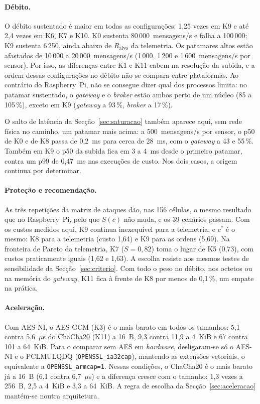 \paragraph{Débito.} O débito sustentado é maior em todas as configurações:
1,25 vezes em K9 e até 2,4 vezes em K6, K7 e K10. K0 sustenta
80\,000~mensagens/s e falha a 100\,000; K9 sustenta 6\,250, ainda abaixo de
$R_{\text{alvo}}$ da telemetria. Os patamares altos estão afastados de 10\,000 a
20\,000~mensagens/s (1\,000, 1\,200 e 1\,600~mensagens/s por sensor). Por isso, as
diferenças entre K1 e K11 cabem na resolução da subida, e a ordem dessas
configurações no débito não se compara entre plataformas. Ao contrário do
Raspberry~Pi, não se consegue dizer qual dos processos limita: no patamar
sustentado, o \emph{gateway} e o \emph{broker} estão ambos perto de um núcleo
(85 a 105\,\%), exceto em K9 (\emph{gateway} a 93\,\%, \emph{broker} a 17\,\%).

O salto de latência da Secção~\ref{sec:saturacao} também aparece aqui, sem rede
física no caminho, um patamar mais acima: a 500~mensagens/s por sensor, o p50 de
K0 e de K8 passa de 0,2~ms para cerca de 28~ms, com o \emph{gateway} a 43 e
55\,\%. Também em K9 o p50 da subida fica em 3 a 4~ms desde o primeiro patamar,
contra um p99 de 0,47~ms nas execuções de custo. Nos dois casos, a origem
continua por determinar.

\paragraph{Proteção e recomendação.} As três repetições da matriz de ataques dão,
nas 156 células, o mesmo resultado que no Raspberry~Pi, pelo que $S(c)$ não muda,
e os 39 cenários passam. Com os custos medidos aqui, K9 continua inexequível para
a telemetria, e $c^*$ é o mesmo: K8 para a telemetria (custo 1,64) e K9 para as
ordens (5,69). Na fronteira de Pareto da telemetria, K7 ($S = 0{,}82$) toma o
lugar de K5 (0,73), com custos praticamente iguais (1,62 e 1,63). A escolha
resiste aos mesmos testes de sensibilidade da Secção~\ref{sec:criterio}. Com todo
o peso no débito, nos octetos ou na memória do \emph{gateway}, K11 fica à frente
de K8 por menos de 0,1\,\%, um empate na prática.

\paragraph{Aceleração.} Com AES-NI, o AES-GCM (K3) é o mais barato em todos os
tamanhos: 5,1 contra 5,6~$\mu$s do ChaCha20 (K11) a 16~B, 9,3 contra 11,9 a
4~KiB e 67 contra 101 a 64~KiB. Para o comparar sem AES em \emph{hardware},
desligaram-se só o AES-NI e o PCLMULQDQ (\texttt{OPENSSL\_ia32cap}), mantendo as
extensões vetoriais, o equivalente a \texttt{OPENSSL\_armcap=1}. Nessas condições,
o ChaCha20 é o mais barato já a 16~B (6,1 contra 6,7~$\mu$s) e a diferença cresce
com o tamanho: 1,3 vezes a 256~B, 2,5 a 4~KiB e 3,3 a 64~KiB. A regra de escolha
da Secção~\ref{sec:aceleracao} mantém-se noutra arquitetura.

